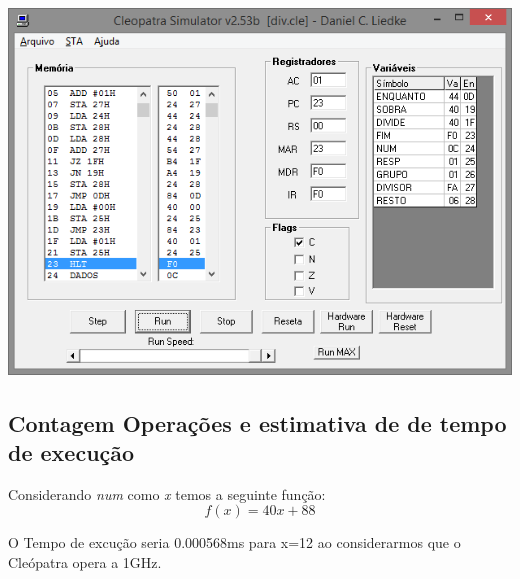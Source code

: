 \includegraphics{images/div.png}

\subsection{Contagem Operações e estimativa de de tempo de execução}

Considerando \emph{num} como \emph{x} temos a seguinte função:
$$f(x) = 40x + 88$$

O Tempo de excução seria 0.000568ms para x=12 ao considerarmos que o Cleópatra
opera a 1GHz.
